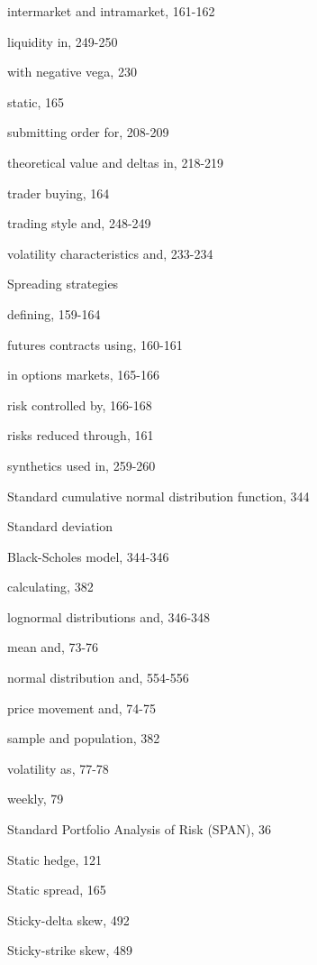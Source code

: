 \noindent intermarket and intramarket, 161-162\par
\noindent liquidity in, 249-250\par
\noindent with negative vega, 230\par
\noindent static, 165\par
\noindent submitting order for, 208-209\par
\noindent theoretical value and deltas in, 218-219\par
\noindent trader buying, 164\par
\noindent trading style and, 248-249\par
\noindent volatility characteristics and, 233-234\par
\noindent Spreading strategies\par
\noindent defining, 159-164\par
\noindent futures contracts using, 160-161\par
\noindent in options markets, 165-166\par
\noindent risk controlled by, 166-168\par
\noindent risks reduced through, 161\par
\noindent synthetics used in, 259-260\par
\noindent Standard cumulative normal distribution function, 344\par
\noindent Standard deviation\par
\noindent Black-Scholes model, 344-346\par
\noindent calculating, 382\par
\noindent lognormal distributions and, 346-348\par
\noindent mean and, 73-76\par
\noindent normal distribution and, 554-556\par
\noindent price movement and, 74-75\par
\noindent sample and population, 382\par
\noindent volatility as, 77-78\par
\noindent weekly, 79\par
\noindent Standard Portfolio Analysis of Risk (SPAN), 36\par
\noindent Static hedge, 121\par
\noindent Static spread, 165\par
\noindent Sticky-delta skew, 492\par
\noindent Sticky-strike skew, 489\par

